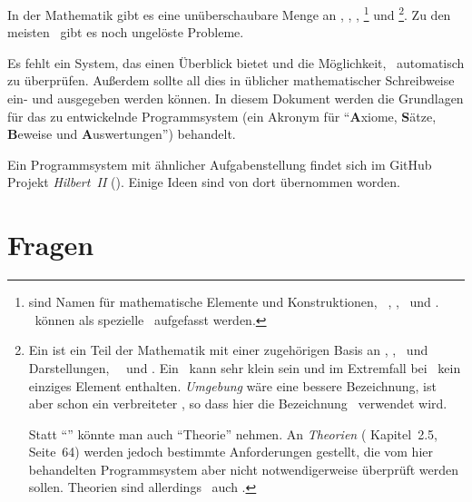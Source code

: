 In der Mathematik gibt es eine unüberschaubare Menge an \Axiomen, \Saetzen, \Beweisen, \emph{\Fachbegriffen}%
\footnote{%
	 sind Namen für mathematische Elemente und Konstruktionen, \textzB\ \Axiomen, \Saetze, \Beweise\ und \Teilgebiete.
	\Symbole\ können als spezielle \Fachbegriffe\ aufgefasst werden.
}
und \emph{\Teilgebieten}%
\footnote{%
	Ein  ist ein Teil der Mathematik mit einer zugehörigen Basis an \Axiomen, \Saetzen, \Fachbegriffen\ und Darstellungen, \textzB\ \Logik\ und \Mengenlehre.
	Ein \Teilgebiet\ kann sehr klein sein und im Extremfall bei \ASBA\ kein einziges Element enthalten.
	\emph{Umgebung} wäre eine bessere Bezeichnung, ist aber schon ein verbreiteter \Fachbegriff, so dass hier die Bezeichnung \Teilgebiet\ verwendet wird.

	Statt "`\Teilgebiet"' könnte man auch "`Theorie"' nehmen.
	An \emph{Theorien} ( Kapitel~2.5, Seite~64) werden jedoch bestimmte Anforderungen gestellt, die vom hier behandelten Programmsystem aber nicht notwendigerweise überprüft werden sollen.
	Theorien sind allerdings \textiAlg\ auch \Teilgebiete.
}.
Zu den meisten \Teilgebieten\ gibt es noch ungelöste Probleme.

Es fehlt ein System, das einen Überblick bietet und die Möglichkeit, \Beweise\ automatisch zu überprüfen.
Außerdem sollte all dies in üblicher mathematischer Schreibweise ein- und ausgegeben werden können.
In diesem Dokument werden die Grundlagen für das zu entwickelnde Programmsystem  (ein Akronym für "`\textbf{A}xiome, \textbf{S}ätze, \textbf{B}eweise und \textbf{A}uswertungen"') behandelt.

Ein Programmsystem mit ähnlicher Aufgabenstellung findet sich im GitHub Projekt \emph{Hilbert~II} (\cite{bib:HilbertII, bib:qedeq}).
Einige Ideen sind von dort übernommen worden.

\section     {Fragen}%
\label   {sec-Fragen}


